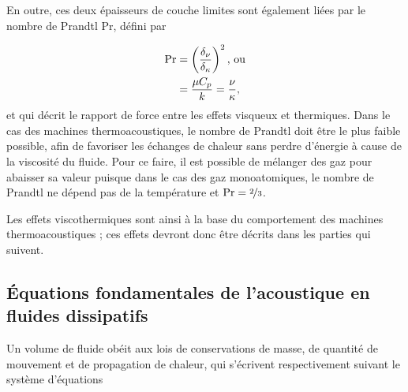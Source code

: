 En outre, ces deux épaisseurs de couche limites sont également liées par le nombre de Prandtl $\mathrm{Pr}$, défini par

\begin{subequations}
	\begin{align}
		\mathrm{Pr} &= \left(\frac{\delta_{\nu}}{\delta_{\kappa}}\right)^2 \text{, ou} \label{eq:Prandtl_delta}\\
				&= \frac{\mu C_{p}}{k} = \frac{\nu}{\kappa}, \label{eq:Prandtl_MuK_NuKappa}
	\end{align}
	\label{eq:Prandtl}%
\end{subequations}
et qui décrit le rapport de force entre les effets visqueux et thermiques. Dans le cas des machines thermoacoustiques, le nombre de Prandtl doit être le plus faible possible, afin de favoriser les échanges de chaleur sans perdre d'énergie à cause de la viscosité du fluide. Pour ce faire, il est possible de mélanger des gaz pour abaisser sa valeur \cite{belcher_working_1999} puisque dans le cas des gaz monoatomiques, le nombre de Prandtl ne dépend pas de la température et $\mathrm{Pr}=\nicefrac{2}{3}$.

Les effets viscothermiques sont ainsi à la base du comportement des machines thermoacoustiques ; ces effets devront donc être décrits dans les parties qui suivent.

\subsection{\'Equations fondamentales de l'acoustique en fluides dissipatifs}

Un volume de fluide obéit aux lois de conservations de masse, de quantité de mouvement et de propagation de chaleur, qui s'écrivent respectivement suivant le système d'équations

